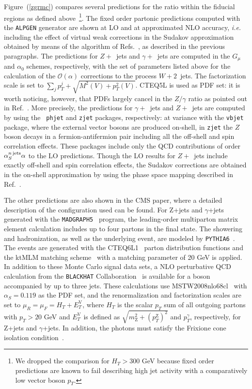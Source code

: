 \documentclass[11pt]{cernrep} \usepackage{graphicx,epsfig} 
\begin{document}
Figure~(\ref{zgrmc}) compares several predictions for the ratio within the fiducial regions as defined above~\footnote{We dropped
the comparison for $H_T>300$ GeV because fixed order predictions are known to fail describing high jet activity with a
comparatively low vector boson $p_T$.}. The fixed
order partonic predictions computed with the {\tt ALPGEN} generator are shown at LO and at 
approximated NLO accuracy, \emph{i.e.} including the effect of virtual weak corrections in the Sudakov approximation obtained by
means of the algorithm of Refs.~\cite{Denner:2000jv,Denner:2001gw}, as described in the previous paragraphs. The
predictions for $Z+$~jets and $\gamma+$~jets are computed in the $G_{\mu}$ and $\alpha_0$ schemes, respectively, with
the set of parameters listed above for the calculation of the $\mathcal{O}(\alpha)$ corrections to the process
$W+2$~jets. The factorization scale is set to $\sum_j p_T^j +\sqrt{M^2(V) +p^2_T(V)}$. CTEQ5L is used as
PDF set: it is worth noticing, however, that PDFs largely cancel in the $Z/\gamma$ ratio as pointed out in
Ref.~\cite{Ask:2011xf}.  More precisely, the predictions for $\gamma+$~jets and $Z+$~jets are computed by using the {\tt
phjet} and {\tt zjet} packages, respectively: at variance with the {\tt vbjet} package, where the external vector bosons
are produced on-shell, in {\tt zjet} the $Z$ boson decays in a fermion-antifermion pair including all the off-shell and
spin correlation effects. These packages include only the QCD contributions of order $\alpha_S^{n \, {\rm jets}} \alpha$
to the LO predictions. Though the LO results for $Z+$~jets include exactly off-shell and spin correlation effects, the
Sudakov corrections are obtained in the on-shell approximation by using the phase space mapping described in
Ref.~\cite{Denner:2014ina}.

The other predictions are also shown in the CMS paper, where a detailed description of the configuration used can be
found. For Z+jets and $\gamma$+jets generated with the {\tt MADGRAPH5}~\cite{MadGraph5} program, the leading-order
multiparton matrix element calculation includes up to four partons in the final state. The
showering and hadronization, as well as the underlying event, are modeled by {\tt PYTHIA6}~\cite{pythia6}. The events
are generated with the CTEQ6L1~\cite{CTEQ6} parton distribution functions and the ktMLM
matching scheme~\cite{MatchingPaper} with a matching parameter of 20 GeV is applied.  
In addition to these Monte Carlo signal data sets, a NLO perturbative QCD calculation from the
{\tt BLACKHAT} Collaboration~\cite{BlackHat} is available for a boson accompanied by up to three jets. These
calculations use MSTW2008nlo68cl~\cite{MSTW} with $\alpha_{S}=0.119$ as the PDF set, and the renormalization and
factorization scales are set to $\mu_{R}=\mu_{F}=H_T+E_T^{\mathrm{V}}$, where $H_T$ is the scalar $p_T$ sum of all
outgoing partons with $p_T>20$ GeV and $E_T^{\mathrm{V}}$ is defined as
$\sqrt{m_{\mathrm{Z}}^{2}+\left(p_T^{\mathrm{Z}}\right)^{2}}$ and $p_T^{\gamma}$, respectively, for Z+jets and $\gamma$+jets.
In addition, the photons must satisfy the Frixione cone isolation condition~\cite{Frixione}.
\end{document}
